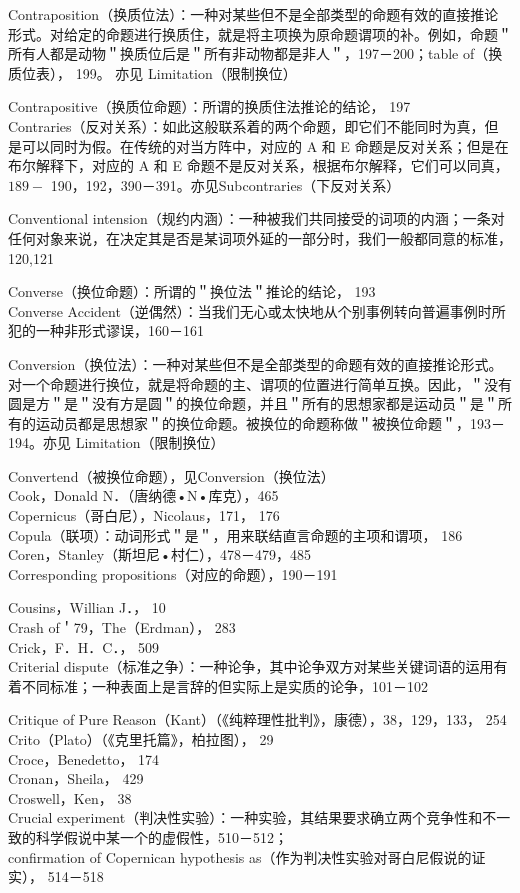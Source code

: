 Contraposition（换质位法）：一种对某些但不是全部类型的命题有效的直接推论形式。对给定的命题进行换质住，就是将主项换为原命题谓项的补。例如，命题＂所有人都是动物＂换质位后是＂所有非动物都是非人＂，197－200；table of（换质位表）， 199。 亦见 Limitation（限制换位）

Contrapositive（换质位命题）：所谓的换质住法推论的结论， 197\\
Contraries（反对关系）：如此这般联系着的两个命题，即它们不能同时为真，但是可以同时为假。在传统的对当方阵中，对应的 A 和 E 命题是反对关系；但是在布尔解释下，对应的 A 和 E 命题不是反对关系，根据布尔解释，它们可以同真， $189-$ 190，192，390－391。亦见Subcontraries（下反对关系）

Conventional intension（规约内涵）：一种被我们共同接受的词项的内涵；一条对任何对象来说，在决定其是否是某词项外延的一部分时，我们一般都同意的标准， 120,121

Converse（换位命题）：所谓的＂换位法＂推论的结论， 193\\
Converse Accident（逆偶然）：当我们无心或太快地从个别事例转向普遍事例时所犯的一种非形式谬误，160－161

Conversion（换位法）：一种对某些但不是全部类型的命题有效的直接推论形式。对一个命题进行换位，就是将命题的主、谓项的位置进行简单互换。因此，＂没有圆是方＂是＂没有方是圆＂的换位命题，并且＂所有的思想家都是运动员＂是＂所有的运动员都是思想家＂的换位命题。被换位的命题称做＂被换位命题＂，193－194。亦见 Limitation（限制换位）

Convertend（被换位命题），见Conversion（换位法）\\
Cook，Donald N．（唐纳德•N•库克），465\\
Copernicus（哥白尼），Nicolaus，171， 176\\
Copula（联项）：动词形式＂是＂，用来联结直言命题的主项和谓项， 186\\
Coren，Stanley（斯坦尼•村仁），478－479，485\\
Corresponding propositions（对应的命题），190－191

Cousins，Willian J．， 10\\
Crash of＇79，The（Erdman）， 283\\
Crick，F．H．C．， 509\\
Criterial dispute（标准之争）：一种论争，其中论争双方对某些关键词语的运用有着不同标准；一种表面上是言辞的但实际上是实质的论争，101－102

Critique of Pure Reason（Kant）（《纯粹理性批判》，康德），38，129，133， 254\\
Crito（Plato）（《克里托篇》，柏拉图）， 29\\
Croce，Benedetto， 174\\
Cronan，Sheila， 429\\
Croswell，Ken， 38\\
Crucial experiment（判决性实验）：一种实验，其结果要求确立两个竞争性和不一致的科学假说中某一个的虚假性，510－512；\\
confirmation of Copernican hypothesis as（作为判决性实验对哥白尼假说的证实）， 514－518

